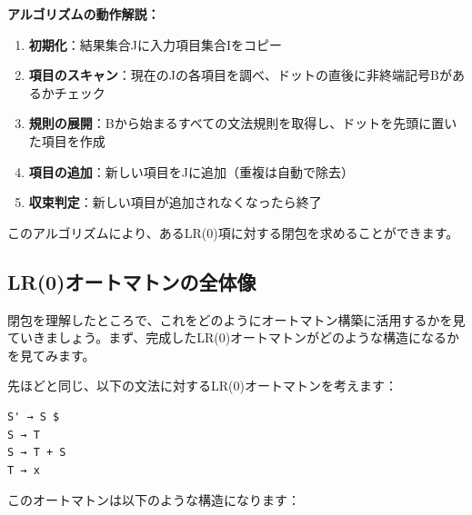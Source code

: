 \textbf{アルゴリズムの動作解説：}

\begin{enumerate}
\def\labelenumi{\arabic{enumi}.}
\tightlist
\item
  \textbf{初期化}：結果集合Jに入力項目集合Iをコピー
\item
  \textbf{項目のスキャン}：現在のJの各項目を調べ、ドットの直後に非終端記号Bがあるかチェック
\item
  \textbf{規則の展開}：Bから始まるすべての文法規則を取得し、ドットを先頭に置いた項目を作成
\item
  \textbf{項目の追加}：新しい項目をJに追加（重複は自動で除去）
\item
  \textbf{収束判定}：新しい項目が追加されなくなったら終了
\end{enumerate}

このアルゴリズムにより、あるLR(0)項に対する閉包を求めることができます。

\hypertarget{chapter5-lr0ux30aaux30fcux30c8ux30deux30c8ux30f3ux306eux5168ux4f53ux50cf}{%
\subsection{LR(0)オートマトンの全体像}\label{chapter5-lr0ux30aaux30fcux30c8ux30deux30c8ux30f3ux306eux5168ux4f53ux50cf}}

閉包を理解したところで、これをどのようにオートマトン構築に活用するかを見ていきましょう。まず、完成したLR(0)オートマトンがどのような構造になるかを見てみます。

先ほどと同じ、以下の文法に対するLR(0)オートマトンを考えます：

\begin{verbatim}
S' → S $
S → T
S → T + S
T → x
\end{verbatim}

このオートマトンは以下のような構造になります：


